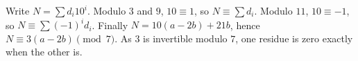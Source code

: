 Write $N=\sum d_i10^i$. Modulo $3$ and $9$, $10\equiv1$, so $N\equiv\sum d_i$. Modulo $11$, $10\equiv-1$, so $N\equiv\sum(-1)^id_i$. Finally $N=10(a-2b)+21b$, hence $N\equiv3(a-2b)\pmod7$. As $3$ is invertible modulo $7$, one residue is zero exactly when the other is.
